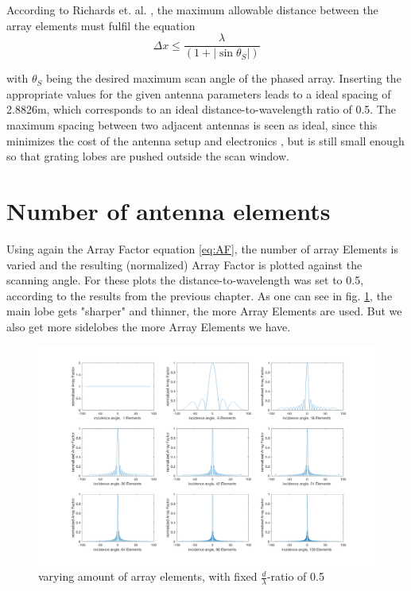According to Richards et. al. \citep{richards2010principles}, the maximum allowable distance between the array elements must fulfil the equation
\begin{equation}
	\Delta x \leq \frac{\lambda}{(1 + |\sin\theta_S |)}
	\label{eq:deltaX}
\end{equation}

with $\theta_S $ being the desired maximum scan angle of the phased array. Inserting the appropriate values for the given antenna parameters leads to a ideal spacing of 2.8826m, which corresponds to an ideal distance-to-wavelength ratio of 0.5. The maximum spacing between two adjacent antennas is seen as ideal, since this minimizes the cost of the antenna setup and electronics \citep{richards2010principles}, but is still small enough so that grating lobes are pushed outside the scan window.

\section{Number of antenna elements}
Using again the Array Factor equation \ref{eq:AF}, the number of array Elements is varied and the resulting (normalized) Array Factor is plotted against the scanning angle. For these plots the distance-to-wavelength was set to 0.5, according to the results from the previous chapter. As one can see in fig. \ref{fig:varyingElements}, the main lobe gets "sharper" and thinner, the more Array Elements are used. But we also get more sidelobes the more Array Elements we have.

\begin{figure}[h!]
	\centering
	\includegraphics[width=\textwidth]{images/elementVariation}
	\caption{varying amount of array elements, with fixed $\frac{d}{\lambda}$-ratio of 0.5}
	\label{fig:varyingElements}
\end{figure}



